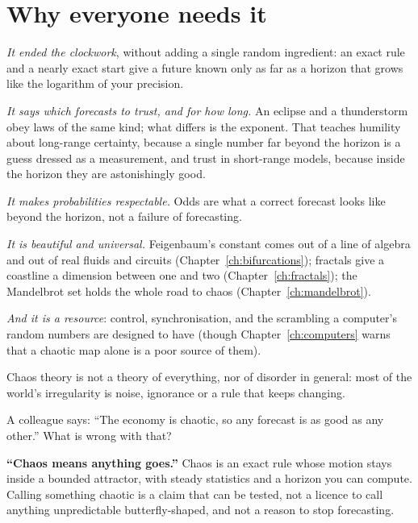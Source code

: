 \section{Why everyone needs it}
\label{sec:ch18-everyone}

\noindent
\emph{It ended the clockwork}, without adding a single random ingredient:
an exact rule and a nearly exact start give a future known only as far as a
horizon that grows like the logarithm of your precision.

\emph{It says which forecasts to trust, and for how long.} An eclipse and a
thunderstorm obey laws of the same kind; what differs is the exponent. That
teaches humility about long-range certainty, because a single number far
beyond the horizon is a guess dressed as a measurement, and trust in
short-range models, because inside the horizon they are astonishingly
good.

\emph{It makes probabilities respectable.} Odds are what a correct forecast
looks like beyond the horizon, not a failure of forecasting.

\emph{It is beautiful and universal.} Feigenbaum's constant comes out of a
line of algebra and out of real fluids and circuits
(Chapter~\ref{ch:bifurcations}); fractals give a coastline a dimension
between one and two (Chapter~\ref{ch:fractals}); the Mandelbrot set holds
the whole road to chaos (Chapter~\ref{ch:mandelbrot}).

\emph{And it is a resource}: control, synchronisation, and the scrambling a
computer's random numbers are designed to have (though
Chapter~\ref{ch:computers} warns that a chaotic map alone is a poor source
of them).

Chaos theory is not a theory of everything, nor of disorder in general:
most of the world's irregularity is noise, ignorance or a rule that keeps
changing.

\begin{think}
A colleague says: \enquote{The economy is chaotic, so any forecast is as
good as any other.} What is wrong with that?
\end{think}

\begin{trapbox}
\textbf{\enquote{Chaos means anything goes.}} Chaos is an exact rule whose
motion stays inside a bounded attractor, with steady statistics and a
horizon you can compute. Calling something chaotic is a claim that can be
tested, not a licence to call anything unpredictable butterfly-shaped, and
not a reason to stop forecasting.
\end{trapbox}

